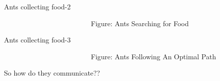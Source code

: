 \documentclass[table]{beamer}
\begin{document}
\begin{frame}{Ants collecting food-2}
		\begin{figure}
			\centering
			\def\svgscale{0.6}
			
		\end{figure}
		\ \ \ \ \ \ \ \ \ \ \ \ \ \ \ \ \ \ \ \ \ \ \ \ \ {\color{blue}Figure:} Ants Searching for Food
\end{frame}


\begin{frame}{Ants collecting food-3}
		\begin{figure}
			\centering
			\def\svgscale{0.6}
			
		\end{figure}
		\ \ \ \ \ \ \ \ \ \ \ \ \ \ \ \ \ \ \ \ \ \ \ \ \ {\color{blue}Figure:} Ants Following An Optimal Path
\end{frame}


\begin{frame}
	\centering
	\vspace{\baselineskip}	\vspace{\baselineskip}
	So how do they communicate??\\ 
	{\vspace{\baselineskip}	\vspace{\baselineskip}}
	\uncover<2->{\textcolor{red}{\huge Pheromone}}
	\vspace{\baselineskip}	\vspace{\baselineskip}
	\begin{figure}
	\end{figure}
\end{frame}
\end{document}
